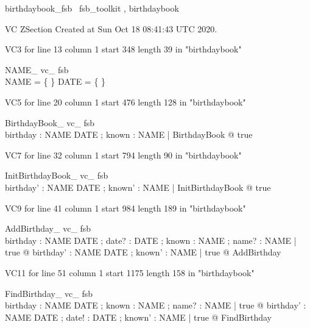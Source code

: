\documentclass{article}
\begin{document}

\begin{zsection}	 \SECTION birthdaybook\_fsb \parents~fsb\_toolkit , birthdaybook
\end{zsection}

VC ZSection Created at Sun Oct 18 08:41:43 UTC 2020.

VC3 for line 13 column 1 start 348 length 39 in "birthdaybook"
\begin{theorem}{ NAME\_ vc\_ fsb}\\
 \lnot NAME = \{ \} \land \lnot DATE = \{ \} \\

\end{theorem}

VC5 for line 20 column 1 start 476 length 128 in "birthdaybook"
\begin{theorem}{ BirthdayBook\_ vc\_ fsb}\\
 \exists birthday : NAME \pfun DATE ; known : \power NAME | BirthdayBook @ true \\

\end{theorem}

VC7 for line 32 column 1 start 794 length 90 in "birthdaybook"
\begin{theorem}{ InitBirthdayBook\_ vc\_ fsb}\\
 \exists birthday' : NAME \pfun DATE ; known' : \power NAME | InitBirthdayBook @ true \\

\end{theorem}

VC9 for line 41 column 1 start 984 length 189 in "birthdaybook"
\begin{theorem}{ AddBirthday\_ vc\_ fsb}\\
 \forall birthday : NAME \pfun DATE ; date? : DATE ; known : \power NAME ; name? : NAME | true @ \exists birthday' : NAME \pfun DATE ; known' : \power NAME | true @ AddBirthday \\

\end{theorem}

VC11 for line 51 column 1 start 1175 length 158 in "birthdaybook"
\begin{theorem}{ FindBirthday\_ vc\_ fsb}\\
 \forall birthday : NAME \pfun DATE ; known : \power NAME ; name? : NAME | true @ \exists birthday' : NAME \pfun DATE ; date! : DATE ; known' : \power NAME | true @ FindBirthday \\

\end{theorem}
\end{document}
